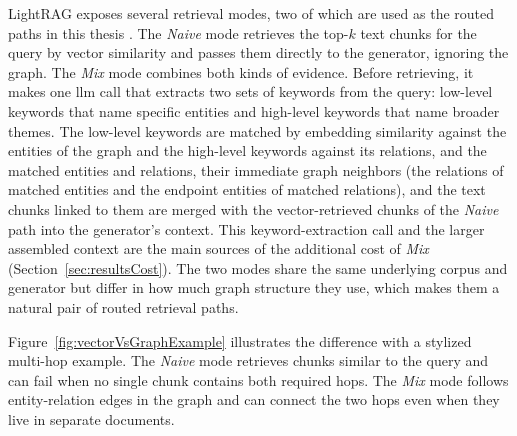 \documentclass[english, bibtex]{kththesis}               %
\numberwithin{listing}{chapter}
\begin{document}
LightRAG exposes several retrieval modes, two of which are used as the routed paths in this thesis \cite{lightrag2024}. The \emph{Naive} mode retrieves the top-\(k\) text chunks for the query by vector similarity and passes them directly to the generator, ignoring the graph. The \emph{Mix} mode combines both kinds of evidence. Before retrieving, it makes one \gls{llm} call that extracts two sets of keywords from the query: low-level keywords that name specific entities and high-level keywords that name broader themes. The low-level keywords are matched by embedding similarity against the entities of the graph and the high-level keywords against its relations, and the matched entities and relations, their immediate graph neighbors (the relations of matched entities and the endpoint entities of matched relations), and the text chunks linked to them are merged with the vector-retrieved chunks of the \emph{Naive} path into the generator's context. This keyword-extraction call and the larger assembled context are the main sources of the additional cost of \emph{Mix} (Section~\ref{sec:resultsCost}). The two modes share the same underlying corpus and generator but differ in how much graph structure they use, which makes them a natural pair of routed retrieval paths.

Figure~\ref{fig:vectorVsGraphExample} illustrates the difference with a stylized multi-hop example. The \emph{Naive} mode retrieves chunks similar to the query and can fail when no single chunk contains both required hops. The \emph{Mix} mode follows entity-relation edges in the graph and can connect the two hops even when they live in separate documents.
\end{document}
